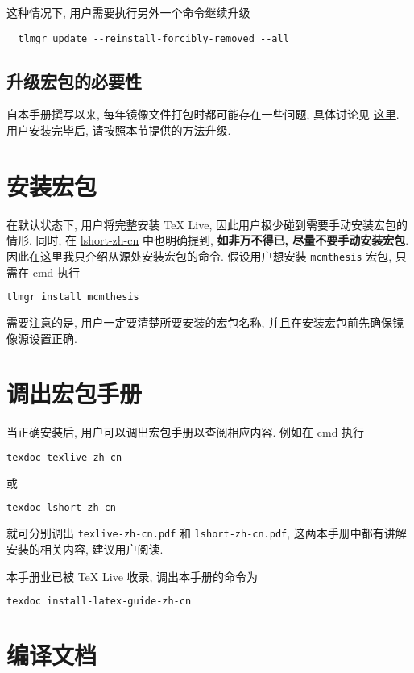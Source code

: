 这种情况下, 用户需要执行另外一个命令继续升级
\begin{lstlisting}
  tlmgr update --reinstall-forcibly-removed --all
\end{lstlisting}

\subsection{升级宏包的必要性}

自本手册撰写以来,
每年镜像文件打包时都可能存在一些问题,
具体讨论见%
\href{https://github.com/CTeX-org/ctex-kit/issues/569}{这里}.
用户安装完毕后,
请按照本节提供的方法升级.

\section{安装宏包}

在默认状态下, 用户将完整安装 \TeX{} Live, 因此用户极少碰到需要手动安装宏包的情形. 
同时, 在
\href{http://mirrors.ctan.org/info/lshort/chinese/lshort-zh-cn.pdf}{lshort-zh-cn}
中也明确提到, \textbf{如非万不得已, 尽量不要手动安装宏包}. 
因此在这里我只介绍从源处安装宏包的命令. 
假设用户想安装 \texttt{mcmthesis} 宏包, 只需在 \textsf{cmd} 执行
\begin{lstlisting}[language=bash]
  tlmgr install mcmthesis
\end{lstlisting}
需要注意的是, 用户一定要清楚所要安装的宏包名称, 并且在安装宏包前先确保镜像源设置正确.

\section{调出宏包手册}

当正确安装后,
用户可以调出宏包手册以查阅相应内容.
例如在 \textsf{cmd} 执行
\begin{lstlisting}[language=bash]
  texdoc texlive-zh-cn
\end{lstlisting}
或
\begin{lstlisting}[language=bash]
  texdoc lshort-zh-cn
\end{lstlisting}
就可分别调出 \texttt{texlive-zh-cn.pdf} 和 \texttt{lshort-zh-cn.pdf},
这两本手册中都有讲解安装的相关内容,
建议用户阅读.

本手册业已被 \TeX{} Live 收录,
调出本手册的命令为
\begin{lstlisting}[language=bash]
  texdoc install-latex-guide-zh-cn
\end{lstlisting}

\section{编译文档}\label{sec:windows:compile}

